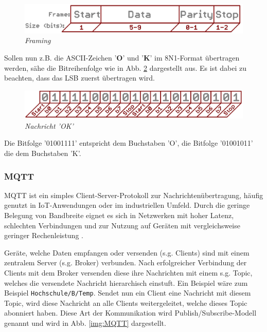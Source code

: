 \vspace{0.5cm}

\begin{figure}[h]
    \vspace{-\baselineskip}
        \centering
        \includegraphics[scale=0.3]{Pictures/uart_framing.png}
        \caption{\textit{Framing \citep{ImgRXTX}}}
        \label{img:uart_framing}
\end{figure}

Sollen nun z.B. die ASCII-Zeichen '\textbf{O}' und '\textbf{K}' im 8N1-Format übertragen werden, 
sähe die Bitreihenfolge wie in Abb. \ref{img:uart_ok} dargestellt aus. Es ist dabei zu beachten, dass das
\acs{LSB} zuerst übertragen wird.

\vspace{0.5cm}

\begin{figure}[h]
    \vspace{-\baselineskip}
        \centering
        \includegraphics[scale=0.3]{Pictures/uart_ok.png}
        \caption{\textit{Nachricht 'OK' \citep{ImgRXTX}}}
        \label{img:uart_ok}
\end{figure}

Die Bitfolge '01001111' entspricht dem Buchstaben 'O', die Bitfolge '01001011' die dem Buchstaben 'K'.



\subsubsection{MQTT} 

MQTT ist ein simples Client-Server-Protokoll zur Nachrichtenübertragung, häufig genutzt in \ac{IoT}-Anwendungen oder im industriellen Umfeld. Durch
die geringe Belegung von Bandbreite eignet es sich in Netzwerken mit hoher Latenz, schlechten Verbindungen und zur Nutzung auf Geräten
mit vergleichsweise geringer Rechenleistung \citep{MQTT_FAQ}.

\smallskip

Geräte, welche Daten empfangen oder versenden (s.g. Clients) sind mit einem zentralem Server (s.g. Broker) verbunden. Nach erfolgreicher Verbindung
der Clients mit dem Broker versenden diese ihre Nachrichten mit einem s.g. Topic, welches die versendete Nachricht hierarchisch einstuft.
Ein Beispiel wäre zum Beispiel \lstinline!Hochschule/B/Temp!. Sendet nun ein Client eine Nachricht mit diesem Topic, wird 
diese Nachricht an alle Clients weitergeleitet, welche dieses Topic abonniert haben. Diese Art der Kommunikation wird Publish/Subscribe-Modell 
genannt \citep{MQTT_Article} und wird in Abb. \ref{img:MQTT} dargestellt. 

